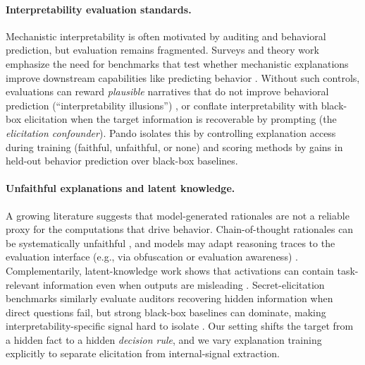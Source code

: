 \documentclass{article} %
\newcommand{\bench}{Pando}
\begin{document}
\paragraph{Interpretability evaluation standards.}
Mechanistic interpretability is often motivated by auditing and behavioral prediction, but evaluation remains fragmented.
Surveys and theory work emphasize the need for benchmarks that test whether mechanistic explanations improve downstream capabilities like predicting behavior \citep{sharkey2025open,rai2024practicalreview,geiger2025causalabstraction}.
Without such controls, evaluations can reward \emph{plausible} narratives that do not improve behavioral prediction (``interpretability illusions'') \citep{sharkey2025open}, or conflate interpretability with black-box elicitation when the target information is recoverable by prompting (the \emph{elicitation confounder}).
\bench{} isolates this by controlling explanation access during training (faithful, unfaithful, or none) and scoring methods by gains in held-out behavior prediction over black-box baselines.

\paragraph{Unfaithful explanations and latent knowledge.}
A growing literature suggests that model-generated rationales are not a reliable proxy for the computations that drive behavior.
Chain-of-thought rationales can be systematically unfaithful \citep{turpin2024language}, and models may adapt reasoning traces to the evaluation interface (e.g., via obfuscation or evaluation awareness) \citep{baker2025monitoring,needham2025evaluation}.
Complementarily, latent-knowledge work shows that activations can contain task-relevant information even when outputs are misleading \citep{burns2023discovering,mallen2023quirky}.
Secret-elicitation benchmarks similarly evaluate auditors recovering hidden information when direct questions fail, but strong black-box baselines can dominate, making interpretability-specific signal hard to isolate \citep{cywinski2025esk}.
Our setting shifts the target from a hidden fact to a hidden \emph{decision rule}, and we vary explanation training explicitly to separate elicitation from internal-signal extraction.
\end{document}
